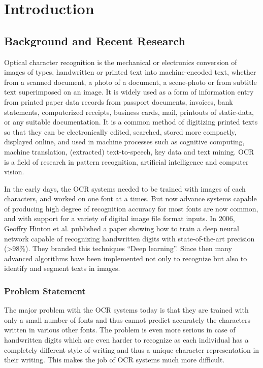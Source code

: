 \chapter{Introduction}

\section{Background and Recent Research}
Optical character recognition is the mechanical or electronics conversion of images of types, handwritten or printed text into machine-encoded text, whether from a scanned document, a photo of a document, a scene-photo or from subtitle text superimposed on an image. It is widely used as a form of information entry from printed paper data records from passport documents, invoices, bank statements, computerized receipts, business cards, mail, printouts of static-data, or any suitable documentation. It is a common method of digitizing printed texts so that they can be electronically edited, searched, stored more compactly, displayed online, and used in machine processes such as cognitive computing, machine translation, (extracted) text-to-speech, key data and text mining. OCR is a field of research in pattern recognition, artificial intelligence and computer vision.

In the early days, the OCR systems needed to be trained with images of each characters, and worked on one font at a times. But now advance systems capable of producing high degree of recognition accuracy for most fonts are now common, and with support for a variety of digital image file format inputs. In 2006, Geoffry Hinton et al. published a paper \autocite{bengio2009learning} showing how to train a deep neural network capable of recognizing handwritten digits with state-of-the-art precision (>98\%). They branded this techniques “Deep learning”. Since then many advanced algorithms have been implemented not only to recognize but also to identify and segment texts in images. 

\subsection{Problem Statement}
The major problem with the OCR systems today is that they are trained with only a small number of fonts and thus cannot predict accurately the characters written in various other fonts. The problem is even more serious in case of handwritten digits which are even harder to recognize as each individual has a completely different style of writing and thus a unique character representation in their writing. This makes the job of OCR systems much more difficult. 

